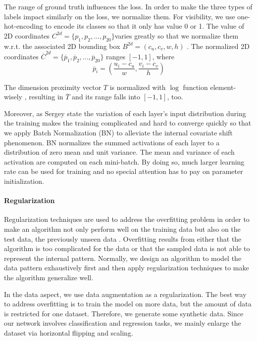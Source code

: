 \documentclass[a4paper,12pt]{article}
\begin{document}
The range of ground truth influences the loss. In order to make the three types of labels impact similarly on the loss, we normalize them. For visibility, we use one-hot-encoding to encode its classes so that it only has value 0 or 1. The value of 2D coordinates $C^{2d}  = \{p_1, p_2, ...,p_{20}\}$varies greatly so that we normalize them w.r.t. the associated 2D bounding box $B^{2d} = (c_u, c_v, w, h)$ \cite{DBLP:journals/corr/ChabotCRTC17}. The normalized 2D coordinates $\overline{C}^{2d}  = \{\overline{p}_1, \overline{p}_2, ...,\overline{p}_{20}\}$ ranges $[-1, 1]$, where
\begin{equation}
\overline{p}_i  = (\frac{u_i - c_u}{w}, \frac{v_i - c_v}{h})
\end{equation}

The dimension proximity vector $T$  is normalized with $\log$ function element-wisely \cite{DBLP:journals/corr/ChabotCRTC17}, resulting in $\overline T$ and its range falls into $[-1, 1]$, too.

Moreover, as Sergey \etal \cite{DBLP:journals/corr/IoffeS15} state the variation of each layer's input distribution during the training makes the training complicated and hard to converge quickly so that we apply Batch Normalization (BN) to alleviate the internal covariate shift phenomenon.  BN normalizes the summed activations of each layer to a distribution of zero mean and unit variance. The mean and variance of each activation are computed on each mini-batch. By doing so, much larger learning rate can be used for training and no special attention has to pay on parameter initialization. 
 
\paragraph{Regularization}
Regularization techniques are used to address the overfitting problem in order to make an algorithm not only perform well on the training data but also on the test data, the previously unseen data \cite{Goodfellow-et-al-2016}. Overfitting results from either that the algorithm is too complicated for the data or that the sampled data is not able to represent the internal pattern. Normally, we design an algorithm to model  the data pattern exhaustively first and then apply regularization techniques to make the algorithm generalize well.  

In the data aspect, we use data augmentation as a regularization. The best way to address overfitting is to train the model on more data, but the amount of data is restricted for one dataset. Therefore, we generate some synthetic data. Since our network involves classification and regression tasks, we mainly enlarge the dataset via horizontal flipping and scaling. 
\end{document}
